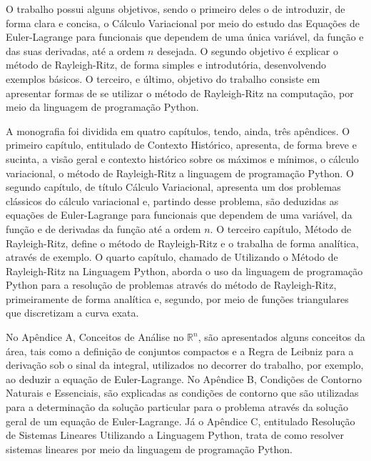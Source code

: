 \documentclass[
	12pt,				%
	openright,			%
    twoside,			%
	a4paper,			%
	english,			%
	french,				%
	spanish,			%
	brazil				%
	]{abntex2}
\numberwithin{lema}{chapter}
\numberwithin{teorema}{chapter}
\numberwithin{definicao}{chapter}
\numberwithin{exemplo}{chapter}
\numberwithin{figure}{chapter}
\begin{document}
O trabalho possui alguns objetivos, sendo o primeiro deles o de introduzir, de forma clara e concisa, o Cálculo Variacional por meio do estudo das Equações de Euler-Lagrange para funcionais que dependem de uma única variável, da função e das suas derivadas, até a ordem $n$ desejada. O segundo objetivo é explicar o método de Rayleigh-Ritz, de forma simples e introdutória, desenvolvendo exemplos básicos. O terceiro, e último, objetivo do trabalho consiste em apresentar formas de se utilizar o método de Rayleigh-Ritz na computação, por meio da linguagem de programação Python.


A monografia foi dividida em quatro capítulos, tendo, ainda, três apêndices. O primeiro capítulo, entitulado de {\color{red}Contexto Histórico}, apresenta, de forma breve e sucinta, a visão geral e contexto histórico sobre os máximos e mínimos, o cálculo variacional, o método de Rayleigh-Ritz a linguagem de programação Python. O segundo capítulo, de título {\color{red}Cálculo Variacional}, apresenta um dos problemas clássicos do cálculo variacional e, partindo desse problema, são deduzidas as equações de Euler-Lagrange para funcionais que dependem de uma variável, da função e de derivadas da função até a ordem $n$. O terceiro capítulo, {\color{red}Método de Rayleigh-Ritz}, define o método de Rayleigh-Ritz e o trabalha de forma analítica, através de exemplo. O quarto capítulo, chamado de {\color{red}Utilizando o Método de Rayleigh-Ritz na Linguagem Python}, aborda o uso da linguagem de programação Python para a resolução de problemas através do método de Rayleigh-Ritz, primeiramente de forma analítica e, segundo, por meio de funções triangulares que discretizam a curva exata.

No Apêndice A, Conceitos de Análise no $\mathbb{R}^n$, são apresentados alguns conceitos da área, tais como a definição de conjuntos compactos e a Regra de Leibniz para a derivação sob o sinal da integral, utilizados no decorrer do trabalho, por exemplo, ao deduzir a equação de Euler-Lagrange. No Apêndice B, Condições de Contorno Naturais e Essenciais, são explicadas as condições de contorno que são utilizadas para a determinação da solução particular para o problema através da solução geral de um equação de Euler-Lagrange. Já o Apêndice C, entitulado Resolução de Sistemas Lineares Utilizando a Linguagem Python, trata de como resolver sistemas lineares por meio da linguagem de programação Python.
\end{document}

